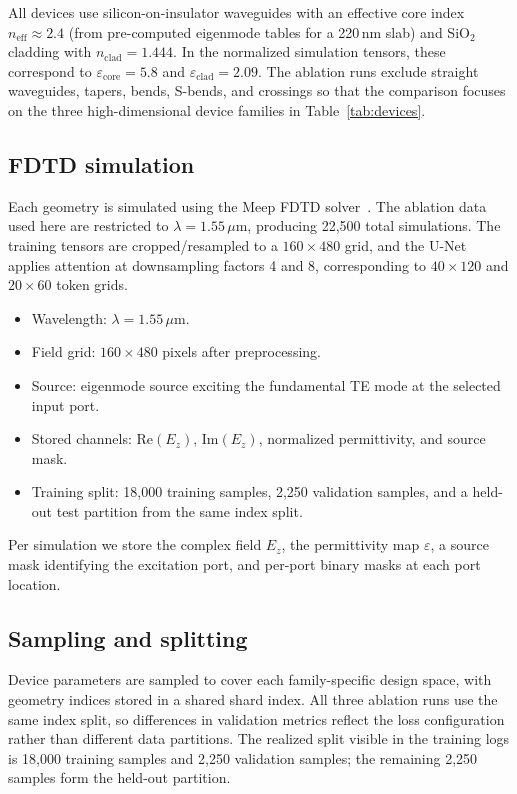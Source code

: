 \documentclass[%
 reprint,
 amsmath,amssymb,
 aps,
floatfix,
]{revtex4-2}
\begin{document}
All devices use silicon-on-insulator waveguides with an effective core index $n_\text{eff}\approx2.4$ (from pre-computed eigenmode tables for a 220\,nm slab) and SiO$_2$ cladding with $n_\text{clad}=1.444$. In the normalized simulation tensors, these correspond to $\varepsilon_\text{core}=5.8$ and $\varepsilon_\text{clad}=2.09$. The ablation runs exclude straight waveguides, tapers, bends, S-bends, and crossings so that the comparison focuses on the three high-dimensional device families in Table~\ref{tab:devices}.

\subsection{FDTD simulation}
Each geometry is simulated using the Meep FDTD solver~\cite{Oskooi2010Meep}. The ablation data used here are restricted to $\lambda=1.55\,\mu$m, producing 22,500 total simulations. The training tensors are cropped/resampled to a $160\times480$ grid, and the U-Net applies attention at downsampling factors 4 and 8, corresponding to $40\times120$ and $20\times60$ token grids.
\begin{itemize}
    \item Wavelength: $\lambda=1.55\,\mu$m.
    \item Field grid: $160\times480$ pixels after preprocessing.
    \item Source: eigenmode source exciting the fundamental TE mode at the selected input port.
    \item Stored channels: $\mathrm{Re}(E_z)$, $\mathrm{Im}(E_z)$, normalized permittivity, and source mask.
    \item Training split: 18,000 training samples, 2,250 validation samples, and a held-out test partition from the same index split.
\end{itemize}

Per simulation we store the complex field $E_z$, the permittivity map $\varepsilon$, a source mask identifying the excitation port, and per-port binary masks at each port location.

\subsection{Sampling and splitting}
Device parameters are sampled to cover each family-specific design space, with geometry indices stored in a shared shard index. All three ablation runs use the same index split, so differences in validation metrics reflect the loss configuration rather than different data partitions. The realized split visible in the training logs is 18,000 training samples and 2,250 validation samples; the remaining 2,250 samples form the held-out partition.
\end{document}
